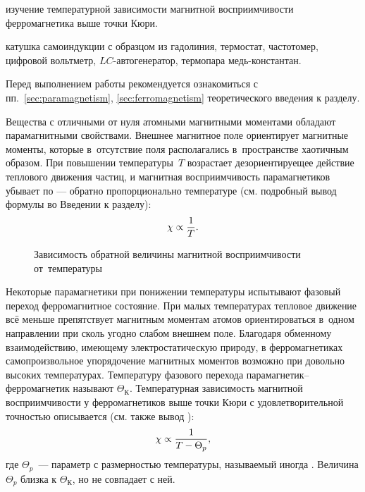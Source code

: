 
\begin{lab:aim}
изучение температурной зависимости магнитной восприимчивости ферромагнетика
выше точки Кюри.
\end{lab:aim}

\begin{lab:equipment}
катушка самоиндукции с образцом из гадолиния, термостат, частотомер,
цифровой вольтметр, $LC$-автогенератор, термопара медь-константан.
\end{lab:equipment}

Перед выполнением работы рекомендуется ознакомиться с
пп.~\ref{sec:paramagnetism}, \ref{sec:ferromagnetism} теоретического
введения к разделу.

Вещества с отличными от нуля атомными магнитными моментами обладают
парамагнитными свойствами. Внешнее магнитное поле ориентирует магнитные моменты,
которые в~отсутствие поля располагались в~пространстве хаотичным образом.
При повышении температуры~$T$ возрастает дезориентируещее действие теплового
движения частиц, и магнитная восприимчивость парамагнетиков убывает
по  --- обратно пропорционально температуре (см.
подробный вывод формулы  во Введении к разделу):
\begin{equation}%
	\chi\propto \frac{1}{T}.
	\eqmark{curi}
\end{equation}

\begin{wrapfigure}{r}{0.4\textwidth}
    \caption{Зависимость обратной величины магнитной восприимчивости
от~температуры}
\end{wrapfigure}

Некоторые парамагнетики при понижении температуры испытывают
фазовый переход ферромагнитное состояние. При малых температурах
тепловое движение всё меньше препятствует магнитным моментам атомов
ориентироваться в~одном направлении при сколь угодно слабом внешнем поле.
Благодаря обменному взаимодействию, имеющему электростатическую природу,
в ферромагнетиках самопроизвольное упорядочение магнитных моментов
возможно при довольно высоких температурах. Температуру фазового перехода
парамагнетик--ферромагнетик называют  $\Theta_К$.
Температурная зависимость магнитной восприимчивости у ферромагнетиков
выше точки Кюри с удовлетворительной точностью
описывается  (см. также вывод
):
\begin{equation}%
    \chi\propto \frac{1}{T-\Theta_p},
    \eqmark{curi-veis}
\end{equation}
где $\Theta_p$~--- параметр с размерностью температуры, называемый
иногда . Величина $\Theta_p$ близка к
$\Theta_К$, но не совпадает с ней.

